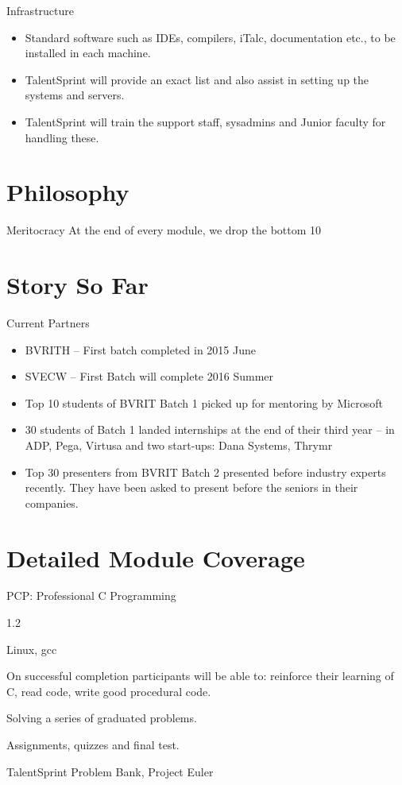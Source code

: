 \documentclass[12pt]{beamer}
\begin{document}
{\begin{frame}{Infrastructure}
\begin{itemize} 
  \item Standard software such as IDEs, compilers, iTalc, documentation etc., to be installed in each machine.
    \item TalentSprint will provide an exact list and also assist in setting up the systems and servers. 
    \item TalentSprint will train the support staff, sysadmins and Junior faculty for handling these.
  \end{itemize}
\end{frame}

\section{Philosophy}
\begin{frame}{Meritocracy}
	At the end of every module, we drop the bottom 10%
\end{frame}
\section{Story So Far}
\begin{frame}{Current Partners}
	\begin{itemize}
		\item BVRITH -- First batch completed in 2015 June
		\item SVECW -- First Batch will complete 2016 Summer
		\item Top 10 students of BVRIT Batch 1 picked up for mentoring by Microsoft
		\item 30 students of Batch 1 landed internships at the end of their third year -- in ADP, Pega, Virtusa and two start-ups: Dana Systems, Thrymr
		\item Top 30 presenters from BVRIT Batch 2 presented before industry experts recently. They have been asked to present before the seniors in their companies.
	\end{itemize}
\end{frame}

\section{Detailed Module Coverage}
\begin{frame}{PCP: Professional C Programming}
  \begin{description}[Resource(S)]
  \item[Slot] 1.2 
  \item[Platform] Linux, gcc
  \item[Objectives] On successful completion participants will be able to: reinforce their learning of C, read code, write good procedural code.
  \item[Pedagogy] Solving a series of graduated problems.
  \item[Assessment] Assignments, quizzes and final test.
  \item[Resource(s)] TalentSprint Problem Bank, Project Euler
  \end{description}
\end{frame}

}
\end{document}

